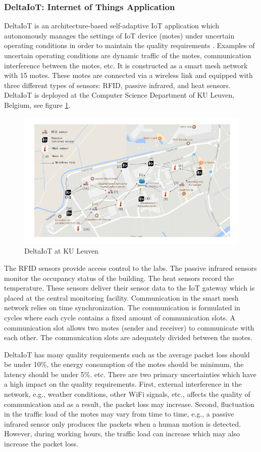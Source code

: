 \documentclass[a4paper,12pt]{article}
\begin{document}
\subsubsection{DeltaIoT: Internet of Things Application}
DeltaIoT is an architecture-based self-adaptive IoT application which autonomously manages the settings of IoT device (motes) under uncertain operating conditions in order to maintain the quality requirements \cite{DELTAIOT-2017}. Examples of uncertain operating conditions are dynamic traffic of the motes, communication interference between the motes, etc. It is constructed as a smart mesh network with 15 motes. These motes are connected via a wireless link and equipped with three different types of sensors: RFID, passive infrared, and heat sensors. DeltaIoT is deployed at the Computer Science Department of KU Leuven, Belgium, see figure \ref{DeltaIoT}.
\begin{figure}[H]
	\centering
	\includegraphics[keepaspectratio, width=\linewidth]{figures/DeltaIoT.pdf}
	\caption{DeltaIoT at KU Leuven \cite{DELTAIOT-2017}}
	\label{DeltaIoT}
\end{figure}
The RFID sensors provide access control to the labs. The passive infrared sensors monitor the occupancy status of the building. The heat sensors record the temperature. These sensors deliver their sensor data to the IoT gateway which is placed at the central monitoring facility. Communication in the smart mesh network relies on time synchronization. The communication is formulated in cycles where each cycle contains a fixed amount of communication slots. A communication slot allows two motes (sender and receiver) to communicate with each other. The communication slots are adequately divided between the motes.

DeltaIoT has many quality requirements such as the average packet loss should be under 10\%, the energy consumption of the motes should be minimum, the latency should be under 5\%. etc. There are two primary uncertainties which have a high impact on the quality requirements. First, external interference in the network, e.g., weather conditions, other WiFi signals, etc., affects the quality of communication and as a result, the packet loss may increase. Second, fluctuation in the traffic load of the motes may vary from time to time, e.g., a passive infrared sensor only produces the packets when a human motion is detected. However, during working hours, the traffic load can increase which may also increase the packet loss.
\end{document}
